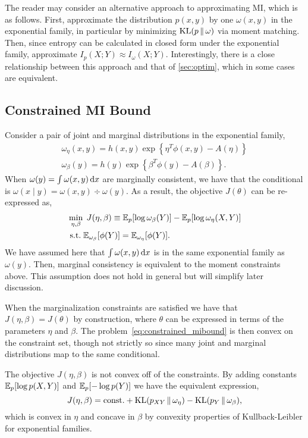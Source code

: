 The reader may consider an alternative approach to approximating MI,
which is as follows.  First, approximate the distribution $p(x,y)$ by
one $\omega(x,y)$ in the exponential family, in particular by
minimizing $\mathrm{KL}(p\,\|\,\omega)$ via moment matching.  Then, since entropy
can be calculated in closed form under the exponential family,
approximate $I_p(X;Y) \approx I_{\omega}(X;Y)$.  Interestingly, there
is a close relationship between this approach and that of
\SEC\ref{sec:optim}, which in some cases are equivalent.

\subsection{Constrained MI Bound}

Consider a pair of joint and marginal distributions in the exponential
family,
\begin{gather*}
  \omega_{\eta}(x,y) = h(x,y)\exp\left\{ \eta^T \phi(x,y) - A(\eta)
    \right\}\\ %
  \omega_{\beta}(y) = h(y)\exp\left\{ \beta^T \phi(y) - A(\beta) \right\}.
\end{gather*}
When $\omega(y) = \int \omega(x,y) \,\mathrm{d} x$ are marginally consistent,
we have that the conditional is $\omega(x\mid y) = \omega(x,y) \div
\omega(y)$.  As a result, the objective $J(\theta)$ can be
re-expressed as,
\begin{align}\label{eq:constrained_mibound}
  &\min_{\eta, \beta} \;J(\eta,\beta) \equiv \mathbb{E}_p[ \log \omega_{\beta}(Y) ] - \mathbb{E}_p[ \log
    \omega_{\eta}(X,Y) ] \notag \\
  &\;\text{s.t.} \; \mathbb{E}_{\omega_{\beta}}[ \phi(Y) ] =
    \mathbb{E}_{\omega_{\eta}}[ \phi(Y) ].
\end{align}
We have assumed here that $\int \omega(x,y) \,\mathrm{d} x$ is in the same
exponential family as $\omega(y)$.  Then, marginal consistency
is equivalent to the moment constraints above.  This assumption does not hold in
general but will simplify later discussion.

When the marginalization constraints are satisfied we have that
$J(\eta,\beta) = J(\theta)$ by construction, where $\theta$ can be
expressed in terms of the parameters $\eta$ and $\beta$.  The
problem~\eqref{eq:constrained_mibound} is then convex on the
constraint set, though not strictly so since many joint and marginal
distributions map to the same conditional.  

The objective $J(\eta,\beta)$ is not convex off of the constraints.
By adding constants $\mathbb{E}_p[ \log p(X,Y) ]$ and $\mathbb{E}_p[ - \log p(Y) ]$
we have the equivalent expression,
\begin{equation*}
  J(\eta,\beta) = \text{const.} + \mathrm{KL}( p_{XY} \,\|\, \omega_{\eta} ) - \mathrm{KL}( p_Y \,\|\,
    \omega_{\beta} ),
\end{equation*}
which is convex in $\eta$ and concave in $\beta$ by convexity
properties of Kullback-Leibler for exponential families.

